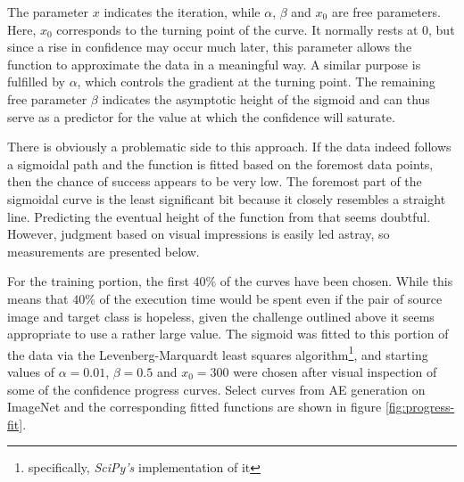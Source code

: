 \documentclass[11pt, a4paper]{article}
\begin{document}
The parameter $x$ indicates the iteration, while $\alpha$, $\beta$ and $x_0$ are free parameters. Here, $x_0$ corresponds to the turning point of the curve. It normally rests at $0$, but since a rise in confidence may occur much later, this parameter allows the function to approximate the data in a meaningful way. A similar purpose is fulfilled by $\alpha$, which controls the gradient at the turning point. The remaining free parameter $\beta$ indicates the asymptotic height of the sigmoid and can thus serve as a predictor for the value at which the confidence will saturate.

There is obviously a problematic side to this approach. If the data indeed follows a sigmoidal path and the function is fitted based on the foremost data points, then the chance of success appears to be very low. The foremost part of the sigmoidal curve is the least significant bit because it closely resembles a straight line. Predicting the eventual height of the function from that seems doubtful. However, judgment based on visual impressions is easily led astray, so measurements are presented below.

For the training portion, the first $40\%$ of the curves have been chosen. While this means that $40\%$ of the execution time would be spent even if the pair of source image and target class is hopeless, given the challenge outlined above it seems appropriate to use a rather large value. The sigmoid was fitted to this portion of the data via the Levenberg-Marquardt least squares algorithm\footnote{specifically, \emph{SciPy's} implementation of it}, and starting values of $\alpha = 0.01$, $\beta = 0.5$ and $x_0 = 300$ were chosen after visual inspection of some of the confidence progress curves. Select curves from AE generation on ImageNet and the corresponding fitted functions are shown in figure \ref{fig:progress-fit}.
\end{document}
